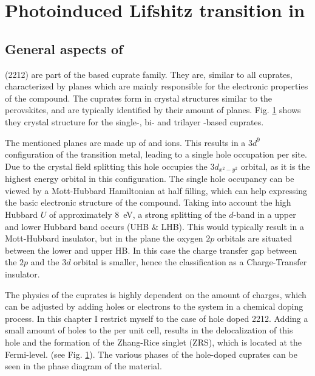\chapter{Photoinduced Lifshitz transition in }



\section{General aspects of }
\label{sec:bscco_general}

 (2212) are part of the  based cuprate family.
They are, similar to all cuprates, characterized by  planes which are mainly responsible for the electronic properties of the compound.
The cuprates form in crystal structures similar to the perovskites, and are typically identified by their amount of  planes.
Fig. \ref{} shows they crystal structure for the single-, bi- and trilayer -based cuprates.

The mentioned  planes are made up of  and  ions.
This results in a $3d^9$ configuration of the transition metal, leading to a single hole occupation per site.
Due to the crystal field splitting this hole occupies the $3d_{x^2-y^2}$ orbital, as it is the highest energy orbital in this configuration.
The single hole occupancy can be viewed by a Mott-Hubbard Hamiltonian at half filling, which can help expressing the basic electronic structure of the compound.
Taking into account the high Hubbard $U$ of approximately \qty{8}{\electronvolt}, a strong splitting of the $d$-band in a upper and lower Hubbard band occurs (UHB \& LHB).
This would typically result in a Mott-Hubbard insulator, but in the  plane the oxygen $2p$ orbitals are situated between the lower and upper HB.
In this case the charge transfer gap between the  $2p$ and the  $3d$ orbital is smaller, hence the classification as a Charge-Transfer insulator. 

The physics of the cuprates is highly dependent on the amount of charges, which can be adjusted by adding holes or electrons to the system in a chemical doping process.
In this chapter I restrict myself to the case of hole doped 2212.
Adding a small amount of holes to the per unit cell, results in the delocalization of this hole and the formation of the Zhang-Rice singlet (ZRS), which is located at the Fermi-level. (see Fig. \ref{}).
The various phases of the hole-doped cuprates can be seen in the phase diagram of the material.

